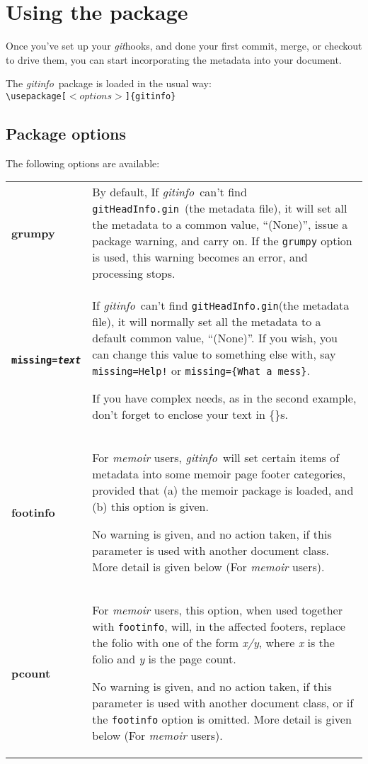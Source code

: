 \documentclass[a4paper,12pt,twoside,openany]{memoir}
\newcommand{\sfit}[1]{\textit{#1}}
\newcommand{\git}{\sfit{git}}
\newcommand{\tpname}{\sfit{gitinfo}}
\newcommand{\ginname}{gitHeadInfo.gin}
\newcommand{\metaname}{\texttt{\ginname}}
\begin{document}
\chapter{Using the package}
\label{ch:using}
Once you've set up your \git hooks, and done your first commit,
merge, or checkout to drive them,
you can start incorporating the metadata into your document.

The \tpname\ package is loaded in the usual way:\\[0.5\baselineskip]
\texttt{\textbackslash usepackage[$<options>$]\{gitinfo\}}

\section{Package options}

The following options are available:\\[0.5\baselineskip]

\noindent
\begin{tabularx}{\textwidth}{@{}>{\ttfamily\bfseries}lX@{}}
grumpy&
By default, If \tpname\ can't find \metaname\ (the metadata file),
it will set all the metadata to a common value, ``(None)'',
issue a package warning, and carry on.
If the \texttt{grumpy} option is used,
this warning becomes an error, and processing stops.
\\
\texttt{missing=\textit{text}}&
If \tpname\ can't find \metaname (the metadata file),
it will normally set all the metadata to a default common value, ``(None)''.
If you wish, you can change this value to something else with, say
\texttt{missing=Help!} or \texttt{missing=\{What a mess\}}.

If you have complex needs, as in the second example,
don't forget to enclose your text in \{\}s. 
\\
footinfo&
For \sfit{memoir} users, \tpname\ will set certain items of metadata into
some memoir page footer categories,
provided that (a) the memoir package is loaded,
and (b) this option is given.

No warning is given, and no action taken,
if this parameter is used with another document class.
More detail is given below (For \textit{memoir} users).
\\
pcount&
For \sfit{memoir} users, this option, when used together with \texttt{footinfo},
will, in the affected footers, replace the folio with one of the form \textit{x/y},
where \textit{x} is the folio and \textit{y} is the page count.

No warning is given, and no action taken,
if this parameter is used with another document class,
or if the \texttt{footinfo} option is omitted.
More detail is given below (For \textit{memoir} users).
\end{tabularx}
\clearpage
\end{document}
